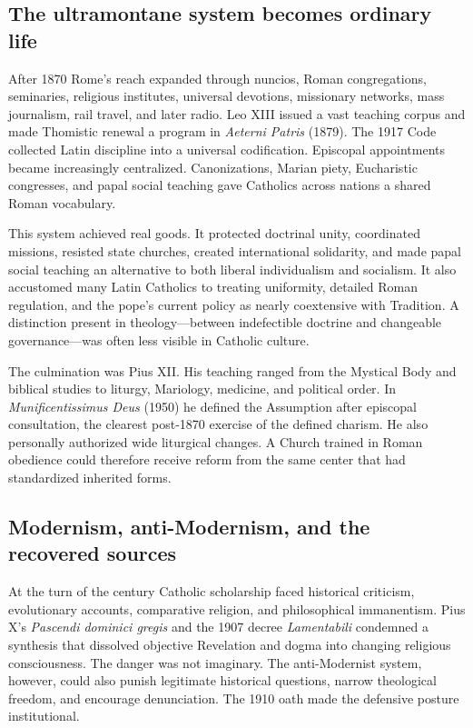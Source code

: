 \subsection{The ultramontane system becomes ordinary life}

After 1870 Rome's reach expanded through nuncios, Roman congregations, seminaries, religious institutes, universal devotions, missionary networks, mass journalism, rail travel, and later radio. Leo XIII issued a vast teaching corpus and made Thomistic renewal a program in \emph{Aeterni Patris} (1879). The 1917 Code collected Latin discipline into a universal codification. Episcopal appointments became increasingly centralized. Canonizations, Marian piety, Eucharistic congresses, and papal social teaching gave Catholics across nations a shared Roman vocabulary.

This system achieved real goods. It protected doctrinal unity, coordinated missions, resisted state churches, created international solidarity, and made papal social teaching an alternative to both liberal individualism and socialism. It also accustomed many Latin Catholics to treating uniformity, detailed Roman regulation, and the pope's current policy as nearly coextensive with Tradition. A distinction present in theology—between indefectible doctrine and changeable governance—was often less visible in Catholic culture.

The culmination was Pius XII. His teaching ranged from the Mystical Body and biblical studies to liturgy, Mariology, medicine, and political order. In \emph{Munificentissimus Deus} (1950) he defined the Assumption after episcopal consultation, the clearest post-1870 exercise of the defined charism. He also personally authorized wide liturgical changes. A Church trained in Roman obedience could therefore receive reform from the same center that had standardized inherited forms.

\subsection{Modernism, anti-Modernism, and the recovered sources}

At the turn of the century Catholic scholarship faced historical criticism, evolutionary accounts, comparative religion, and philosophical immanentism. Pius X's \emph{Pascendi dominici gregis} and the 1907 decree \emph{Lamentabili} condemned a synthesis that dissolved objective Revelation and dogma into changing religious consciousness. The danger was not imaginary. The anti-Modernist system, however, could also punish legitimate historical questions, narrow theological freedom, and encourage denunciation. The 1910 oath made the defensive posture institutional.

